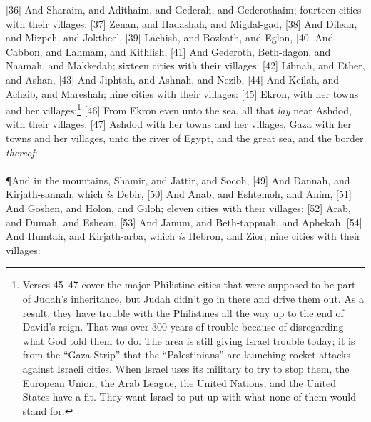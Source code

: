 [36] \textcolor[rgb]{0.00,0.00,1.00}{And Sharaim, and Adithaim, and Gederah, and Gederothaim; fourteen cities with their villages:}
[37] \textcolor[rgb]{0.00,0.00,1.00}{Zenan, and Hadashah, and Migdal-gad,}
[38] \textcolor[rgb]{0.00,0.00,1.00}{And Dilean, and Mizpeh, and Joktheel,}
[39] \textcolor[rgb]{0.00,0.00,1.00}{Lachish, and Bozkath, and Eglon,}
[40] \textcolor[rgb]{0.00,0.00,1.00}{And Cabbon, and Lahmam, and Kithlish,}
[41] \textcolor[rgb]{0.00,0.00,1.00}{And Gederoth, Beth-dagon, and Naamah, and Makkedah; sixteen cities with their villages:}
[42] \textcolor[rgb]{0.00,0.00,1.00}{Libnah, and Ether, and Ashan,}
[43] \textcolor[rgb]{0.00,0.00,1.00}{And Jiphtah, and Ashnah, and Nezib,}
[44] \textcolor[rgb]{0.00,0.00,1.00}{And Keilah, and Achzib, and Mareshah; nine cities with their villages:}
[45] \textcolor[rgb]{0.00,0.00,1.00}{Ekron, with her towns and her villages:}\footnote{Verses 45–47 cover the major Philistine
cities that were supposed to be part of Judah’s
inheritance, but Judah didn’t go in there and
drive them out. As a result, they have trouble
with the Philistines all the way up to the end of
David’s reign. That was over 300 years of
trouble because of disregarding what God told
them to do. The area is still giving Israel trouble
today; it is from the “Gaza Strip” that the
“Palestinians” are launching rocket attacks
against Israeli cities. When Israel uses its
military to try to stop them, the European
Union, the Arab League, the United Nations,
and the United States have a fit. They want
Israel to put up with what none of them would
stand for.}
[46] \textcolor[rgb]{0.00,0.00,1.00}{From Ekron even unto the sea, all that \emph{lay} near Ashdod, with their villages:}
[47] \textcolor[rgb]{0.00,0.00,1.00}{Ashdod with her towns and her villages, Gaza with her towns and her villages, unto the river of Egypt, and the great sea, and the border \emph{thereof}:}\\
\\
\P \textcolor[rgb]{0.00,0.00,1.00}{And in the mountains, Shamir, and Jattir, and Socoh,}
[49] \textcolor[rgb]{0.00,0.00,1.00}{And Dannah, and Kirjath-sannah, which \emph{is} Debir,}
[50] \textcolor[rgb]{0.00,0.00,1.00}{And Anab, and Eshtemoh, and Anim,}
[51] \textcolor[rgb]{0.00,0.00,1.00}{And Goshen, and Holon, and Giloh; eleven cities with their villages:}
[52] \textcolor[rgb]{0.00,0.00,1.00}{Arab, and Dumah, and Eshean,}
[53] \textcolor[rgb]{0.00,0.00,1.00}{And Janum, and Beth-tappuah, and Aphekah,}
[54] \textcolor[rgb]{0.00,0.00,1.00}{And Humtah, and Kirjath-arba, which \emph{is} Hebron, and Zior; nine cities with their villages:}
